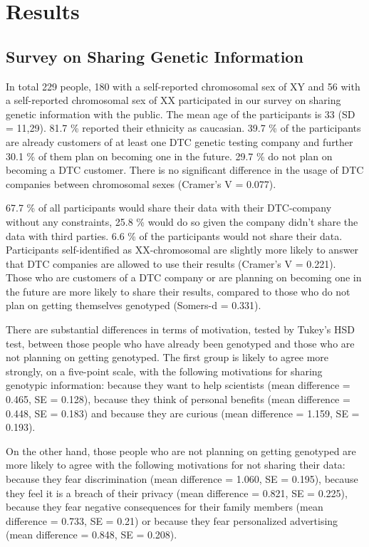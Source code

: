 \documentclass[10pt]{article}
\begin{document}
\section*{Results}

\subsection*{Survey on Sharing Genetic Information}
In total 229 people, 180 with a self-reported chromosomal sex of XY and 56 with a self-reported chromosomal sex of XX participated in our survey on sharing genetic information with the public. 
The mean age of the participants is 33 (SD = 11,29). 81.7 \% reported their ethnicity as caucasian. 39.7 \% of the participants are already 
customers of at least one DTC genetic testing company and further 30.1 \% of them plan on becoming one in the future. 29.7 \% do not plan on 
becoming a DTC customer. There is no significant difference in the usage of DTC companies between chromosomal sexes (Cramer's V = 0.077). 

67.7 \% of all participants would share their data with their DTC-company without any constraints, 25.8 \% would do so given the company 
didn't share the data with third parties. 6.6 \% of the participants would not share their data. Participants self-identified as XX-chromosomal are slightly more likely to answer that DTC companies are allowed to use their results (Cramer's V = 0.221). Those who are customers of a DTC company or are planning on becoming one in 
the future are more likely to share their results, compared to those who do not plan on getting themselves genotyped (Somers-d = 0.331). 

There are substantial differences in terms of motivation, tested by Tukey's HSD test, between those people who have already been genotyped 
and those who are not planning on getting genotyped. The first group is likely to agree more strongly, on a five-point scale, with the following 
motivations for sharing genotypic information: because they want to help scientists (mean difference = 0.465, SE = 0.128), 
because they think of personal benefits (mean difference = 0.448, SE = 0.183) and because they are curious (mean difference = 1.159, SE = 0.193). 

On the other hand, those people who are not planning on getting genotyped are more likely to agree with the following motivations 
for not sharing their data: because they fear discrimination (mean difference = 1.060, SE = 0.195), because they feel 
it is a breach of their privacy (mean difference = 0.821, SE = 0.225), because they fear negative consequences for their 
family members (mean difference = 0.733, SE = 0.21) or because they fear personalized advertising (mean difference = 0.848, SE = 0.208).
\end{document}
